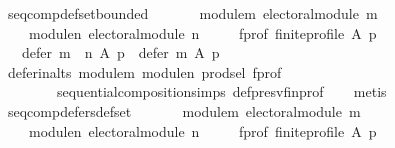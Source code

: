\begin{isabellebody}
\isanewline
%
\endisadelimproof
\isanewline
{}\isamarkupfalse%
\ seq{\isacharunderscore}{\kern0pt}comp{\isacharunderscore}{\kern0pt}def{\isacharunderscore}{\kern0pt}set{\isacharunderscore}{\kern0pt}bounded{\isacharcolon}{\kern0pt}\isanewline
\ \ \isanewline
\ \ \ \ module{\isacharunderscore}{\kern0pt}m{\isacharcolon}{\kern0pt}\ {\isachardoublequoteopen}electoral{\isacharunderscore}{\kern0pt}module\ m{\isachardoublequoteclose}\ \isanewline
\ \ \ \ module{\isacharunderscore}{\kern0pt}n{\isacharcolon}{\kern0pt}\ {\isachardoublequoteopen}electoral{\isacharunderscore}{\kern0pt}module\ n{\isachardoublequoteclose}\ \isanewline
\ \ \ \ f{\isacharunderscore}{\kern0pt}prof{\isacharcolon}{\kern0pt}\ {\isachardoublequoteopen}finite{\isacharunderscore}{\kern0pt}profile\ A\ p{\isachardoublequoteclose}\isanewline
\ \ \ {\isachardoublequoteopen}defer\ {\isacharparenleft}{\kern0pt}m\ {\isasymtriangleright}\ n{\isacharparenright}{\kern0pt}\ A\ p\ {\isasymsubseteq}\ defer\ m\ A\ p{\isachardoublequoteclose}\isanewline
%
\isadelimproof
\ \ %
\endisadelimproof
%
\isatagproof
{}\isamarkupfalse%
\ defer{\isacharunderscore}{\kern0pt}in{\isacharunderscore}{\kern0pt}alts\ module{\isacharunderscore}{\kern0pt}m\ module{\isacharunderscore}{\kern0pt}n\ prod{\isachardot}{\kern0pt}sel{\isacharparenleft}{\kern0pt}{}{\isacharparenright}{\kern0pt}\ f{\isacharunderscore}{\kern0pt}prof\isanewline
\ \ \ \ \ \ \ \ sequential{\isacharunderscore}{\kern0pt}composition{\isachardot}{\kern0pt}simps\ def{\isacharunderscore}{\kern0pt}presv{\isacharunderscore}{\kern0pt}fin{\isacharunderscore}{\kern0pt}prof\isanewline
\ \ \isamarkupfalse%
\ metis%
\endisatagproof
{\isafoldproof}%
%
\isadelimproof
\isanewline
%
\endisadelimproof
\isanewline
{}\isamarkupfalse%
\ seq{\isacharunderscore}{\kern0pt}comp{\isacharunderscore}{\kern0pt}defers{\isacharunderscore}{\kern0pt}def{\isacharunderscore}{\kern0pt}set{\isacharcolon}{\kern0pt}\isanewline
\ \ \isanewline
\ \ \ \ module{\isacharunderscore}{\kern0pt}m{\isacharcolon}{\kern0pt}\ {\isachardoublequoteopen}electoral{\isacharunderscore}{\kern0pt}module\ m{\isachardoublequoteclose}\ \isanewline
\ \ \ \ module{\isacharunderscore}{\kern0pt}n{\isacharcolon}{\kern0pt}\ {\isachardoublequoteopen}electoral{\isacharunderscore}{\kern0pt}module\ n{\isachardoublequoteclose}\ \isanewline
\ \ \ \ f{\isacharunderscore}{\kern0pt}prof{\isacharcolon}{\kern0pt}\ {\isachardoublequoteopen}finite{\isacharunderscore}{\kern0pt}profile\ A\ p{\isachardoublequoteclose}\isanewline

\end{isabellebody}
